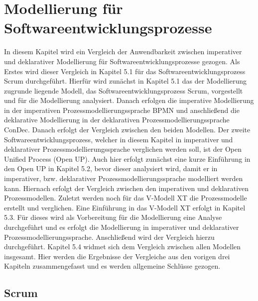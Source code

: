 \chapter{Modellierung für Softwareentwicklungsprozesse}\label{sec:chapter6}
In diesem Kapitel wird ein Vergleich der Anwendbarkeit zwischen imperativer und deklarativer Modellierung für Softwareentwicklungsprozesse gezogen. Als Erstes wird dieser Vergleich in Kapitel 5.1 für das Softwareentwicklungsprozess Scrum durchgeführt. Hierfür wird zunächst in Kapitel 5.1 das der Modellierung zugrunde liegende Modell, das Softwareentwicklungsprozess Scrum, vorgestellt und für die Modellierung analysiert. Danach erfolgen die imperative Modellierung in der imperativen Prozessmodellierungssprache BPMN und anschließend die deklarative Modellierung in der deklarativen Prozessmodellierungssprache ConDec. Danach erfolgt der Vergleich zwischen den beiden Modellen.\newline
Der zweite Softwareentwicklungsprozess, welcher in diesem Kapitel in imperativer und deklarativer Prozessmodellierungssprache verglichen werden soll, ist der Open Unified Process (Open UP). Auch hier erfolgt zunächst eine kurze Einführung in den Open UP in Kapitel 5.2, bevor dieser analysiert wird, damit er in imperativer, bzw. deklarativer Prozessmodellierungssprache modelliert werden kann. Hiernach erfolgt der Vergleich zwischen den imperativen und deklarativen Prozessmodellen.\newline
Zuletzt werden noch für das V-Modell XT die Prozessmodelle erstellt und verglichen. Eine Einführung in das V-Modell XT erfolgt in Kapitel 5.3. Für dieses wird als Vorbereitung für die Modellierung eine Analyse durchgeführt und es erfolgt die Modellierung in imperativer und deklarativer Prozessmodellierungssprache. Anschließend wird der Vergleich hierzu durchgeführt.\newline
Kapitel 5.4 widmet sich dem Vergleich zwischen allen Modellen insgesamt. Hier werden die Ergebnisse der Vergleiche aus den vorigen drei Kapiteln zusammengefasst und es werden allgemeine Schlüsse gezogen.\newline


\section{Scrum}\label{sec:chapter6:Imperative Modellierung}

